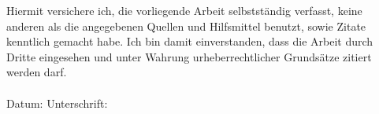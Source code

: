 \label{erklaerung}


Hiermit versichere ich, die vorliegende Arbeit selbstständig verfasst, keine anderen als die angegebenen Quellen und Hilfsmittel benutzt, sowie Zitate kenntlich gemacht habe. Ich bin damit einverstanden, dass die Arbeit durch Dritte eingesehen und unter Wahrung urheberrechtlicher Grundsätze zitiert werden darf. \\
\\[1.5cm]
Datum:	\hrulefill\enspace Unterschrift: \hrulefill
\\[3.5cm]
